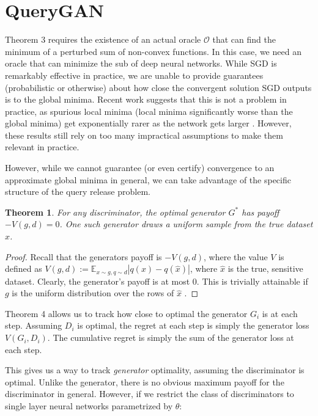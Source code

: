 \documentclass[]{article}
\newtheorem{theorem}{Theorem}[section]
\theoremstyle{definition}
\begin{document}
\section{QueryGAN}

Theorem 3 requires the existence of an actual oracle $\mathcal{O}$ that can find the minimum of a perturbed sum of non-convex functions. In this case, we need an oracle that can minimize the sub of deep neural networks. While SGD is remarkably effective in practice, we are unable to provide guarantees (probabilistic or otherwise) about how close the convergent solution SGD outputs is to the global minima. Recent work suggests that this is not a problem in practice, as spurious local minima (local minima significantly worse than the global minima) get exponentially rarer as the network gets larger \cite{CHM+14}. However, these results still rely on too many impractical assumptions to make them relevant in practice. 

However, while we cannot guarantee (or even certify) convergence to an approximate global minima in general, we can take advantage of the specific structure of the query release problem. 

\begin{theorem}
    For any discriminator, the optimal generator $G^*$ has payoff $-V(g,d) = 0$. One such generator draws a uniform sample from the true dataset $\hat x$. 
\end{theorem}
\begin{proof}
    Recall that the generators payoff is  $-V(g,d)$, where the value $V$ is defined as $V(g,d) := \mathbb{E}_{x \sim g, q \sim d} |q(x) - q(\hat x)|$, where $\hat x$ is the true, sensitive dataset. Clearly, the generator's payoff is at most $0$. This is trivially attainable if $g$ is the uniform distribution over the rows of $\hat x$ .
\end{proof}



Theorem 4 allows us to track how close to optimal the generator $G_i$ is at each step. Assuming $D_i$ is optimal, the regret at each step is simply the generator loss $V(G_i, D_i)$. The cumulative regret is simply the sum of the generator loss at each step. 

This gives us a way to track \emph{generator} optimality, assuming the discriminator is optimal. Unlike the generator, there is no obvious maximum payoff for the discriminator in general. 
However, if we restrict the class of discriminators to single layer neural networks parametrized by $\theta$:
\end{document}
